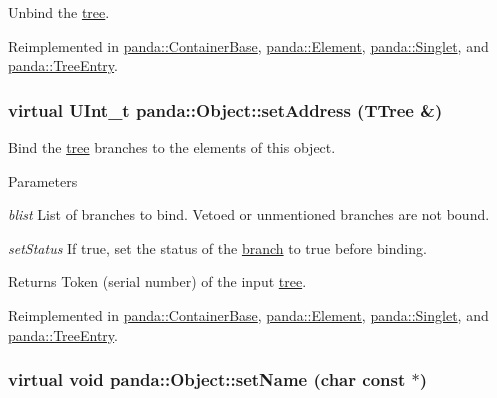 Unbind the \hyperlink{namespacepanda_1_1tree}{tree}. 

Reimplemented in \hyperlink{classpanda_1_1ContainerBase_a5e646fde2bfb6e9650d2e3db5c80a349}{panda::ContainerBase}, \hyperlink{classpanda_1_1Element_a526ce926da6ed144bcf41a43e906f91b}{panda::Element}, \hyperlink{classpanda_1_1Singlet_aee6f5070599294eaef7a88b88dad389a}{panda::Singlet}, and \hyperlink{classpanda_1_1TreeEntry_a3d54b23c121628d22c65c26482d7cab0}{panda::TreeEntry}.\hypertarget{classpanda_1_1Object_aed9f9d3b6abe518dd27957de843b36b5}{
\subsubsection[{setAddress}]{\setlength{\rightskip}{0pt plus 5cm}virtual UInt\_\-t panda::Object::setAddress (TTree \&)}}
\label{classpanda_1_1Object_aed9f9d3b6abe518dd27957de843b36b5}


Bind the \hyperlink{namespacepanda_1_1tree}{tree} branches to the elements of this object. 
\begin{DoxyParams}{Parameters}
\item[{\em blist}]List of branches to bind. Vetoed or unmentioned branches are not bound. \item[{\em setStatus}]If true, set the status of the \hyperlink{namespacepanda_1_1branch}{branch} to true before binding. \end{DoxyParams}
\begin{DoxyReturn}{Returns}
Token (serial number) of the input \hyperlink{namespacepanda_1_1tree}{tree}. 
\end{DoxyReturn}


Reimplemented in \hyperlink{classpanda_1_1ContainerBase_ad5fdf0c76a93e2c5ae563ad34b268e43}{panda::ContainerBase}, \hyperlink{classpanda_1_1Element_a0f4c9e587ee4c4ccbc27b76b06adbc80}{panda::Element}, \hyperlink{classpanda_1_1Singlet_ac5daab18f365a00fe5dbdc887d173e05}{panda::Singlet}, and \hyperlink{classpanda_1_1TreeEntry_a693015be3e9d7c6daffe056798150455}{panda::TreeEntry}.\hypertarget{classpanda_1_1Object_a7bba3813f78065be847cd8d85bab93fc}{
\subsubsection[{setName}]{\setlength{\rightskip}{0pt plus 5cm}virtual void panda::Object::setName (char const $\ast$)}}
\label{classpanda_1_1Object_a7bba3813f78065be847cd8d85bab93fc}



